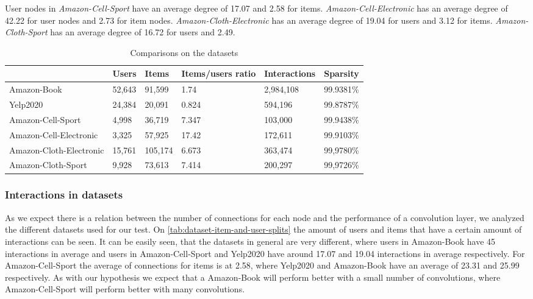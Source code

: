 User nodes in \textit{Amazon-Cell-Sport} have an average degree of 17.07 and 2.58 for items.
\textit{Amazon-Cell-Electronic} has an average degree of 42.22 for user nodes and 2.73 for item nodes.
\textit{Amazon-Cloth-Electronic} has an average degree of 19.04 for users and 3.12 for items.
\textit{Amazon-Cloth-Sport} has an average degree of 16.72 for users and 2.49.
\\
\begin{table*}[]
    \centering
    \begin{tabular}{|l|l|l|l|l|l|}
        \hline
                                & Users  & Items   & Items/users ratio & Interactions & Sparsity  \\ \hline
        Amazon-Book             & 52,643 & 91,599  & 1.74              & 2,984,108    & 99.9381\% \\ \hline
        Yelp2020                & 24,384 & 20,091  & 0.824             & 594,196      & 99.8787\% \\ \hline
        Amazon-Cell-Sport       & 4,998  & 36,719  & 7.347             & 103,000      & 99.9438\% \\ \hline
        Amazon-Cell-Electronic  & 3,325  & 57,925  & 17.42             & 172,611      & 99.9103\% \\ \hline
        Amazon-Cloth-Electronic & 15,761 & 105,174 & 6.673             & 363,474      & 99,9780\% \\ \hline
        Amazon-Cloth-Sport      & 9,928  & 73,613  & 7.414             & 200,297      & 99,9726\% \\ \hline
    \end{tabular}
    \caption{Comparisons on the datasets}
    \label{tab:dataset-comparison}
\end{table*}

\subsubsection{Interactions in datasets}
As we expect there is a relation between the number of connections for each node and the performance of a convolution layer, we analyzed the different datasets used for our test.
On \autoref{tab:dataset-item-and-user-splits} the amount of users and items that have a certain amount of interactions can be seen.
It can be easily seen, that the datasets in general are very different, where users in Amazon-Book have 45 interactions in average and users in Amazon-Cell-Sport and Yelp2020 have around 17.07 and 19.04 interactions in average respectively.
For Amazon-Cell-Sport the average of connections for items is at 2.58, where Yelp2020 and Amazon-Book have an average of 23.31 and 25.99 respectively.
As with our hypothesis we expect that a Amazon-Book will perform better with a small number of convolutions, where Amazon-Cell-Sport will perform better with many convolutions.

